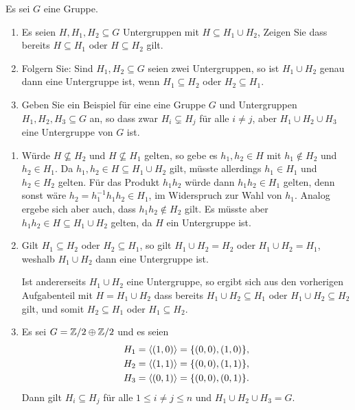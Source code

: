 \begin{question}
  Es sei $G$ eine Gruppe.
  \begin{enumerate}
    \item
      Es seien $H, H_1, H_2 \subseteq G$ Untergruppen mit $H \subseteq H_1 \cup H_2$,
      Zeigen Sie dass bereits $H \subseteq H_1$ oder $H \subseteq H_2$ gilt.
    \item
      Folgern Sie:
      Sind $H_1, H_2 \subseteq G$ seien zwei Untergruppen, so ist $H_1 \cup H_2$ genau dann eine Untergruppe ist, wenn $H_1 \subseteq H_2$ oder $H_2 \subseteq H_1$.
    \item
      Geben Sie ein Beispiel für eine eine Gruppe $G$ und Untergruppen $H_1, H_2, H_3 \subseteq G$ an, so dass zwar $H_i \subsetneq H_j$ für alle $i \neq j$, aber $H_1 \cup H_2 \cup H_3$ eine Untergruppe von $G$ ist.
  \end{enumerate}
\end{question}


\begin{solution}
  \begin{enumerate}
    \item
      Würde $H \nsubseteq H_2$ und $H \nsubseteq H_1$ gelten, so gebe es $h_1, h_2 \in H$ mit $h_1 \notin H_2$ und $h_2 \in H_1$.
      Da $h_1, h_2 \in H \subseteq H_1 \cup H_2$ gilt, müsste allerdings $h_1 \in H_1$ und $h_2 \in H_2$ gelten.
      Für das Produkt $h_1 h_2$ würde dann $h_1 h_2 \in H_1$ gelten, denn sonst wäre $h_2 = h_1^{-1} h_1 h_2 \in H_1$, im Widerspruch zur Wahl von $h_1$.
      Analog ergebe sich aber auch, dass $h_1 h_2 \notin H_2$ gilt.
      Es müsste aber $h_1 h_2 \in H \subseteq H_1 \cup H_2$ gelten, da $H$ ein Untergruppe ist.
      
    \item
      Gilt $H_1 \subseteq H_2$ oder $H_2 \subseteq H_1$, so gilt $H_1 \cup H_2 = H_2$ oder $H_1 \cup H_2 = H_1$, weshalb $H_1 \cup H_2$ dann eine Untergruppe ist.
      
      Ist andererseits $H_1 \cup H_2$ eine Untergruppe, so ergibt sich aus den vorherigen Aufgabenteil mit $H = H_1 \cup H_2$ dass bereits $H_1 \cup H_2 \subseteq H_1$ oder $H_1 \cup H_2 \subseteq H_2$ gilt, und somit $H_2 \subseteq H_1$ oder $H_1 \subseteq H_2$.
      
    \item
      Es sei $G = \mathbb{Z}/2 \oplus \mathbb{Z}/2$ und es seien
      \begin{align*}
        H_1 &= \left\langle  (1,0)  \right\rangle = \{ (0,0), (1,0) \},
        \\
        H_2 &= \left\langle  (1,1)  \right\rangle = \{ (0,0), (1,1) \},
        \\
        H_3 &= \left\langle  (0,1)  \right\rangle = \{ (0,0), (0,1) \}.
      \end{align*}
      Dann gilt $H_i \subseteq H_j$ für alle $1 \leq i \neq j \leq n$ und $H_1 \cup H_2 \cup H_3 = G$.
  \end{enumerate}
\end{solution}


